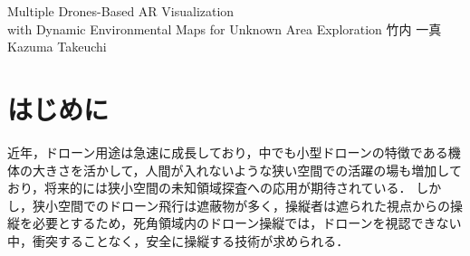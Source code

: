 \documentclass[a4paper,10pt,twocolumn,uplatex]{jsarticle}
\date{1}
\begin{document}
{Multiple Drones-Based AR Visualization \\with Dynamic Environmental Maps for Unknown Area Exploration}
{竹内 一真}
{Kazuma Takeuchi}


\section{はじめに}
近年，ドローン用途は急速に成長しており，中でも小型ドローンの特徴である機体の大きさを活かして，人間が入れないような狭い空間での活躍の場も増加しており，将来的には狭小空間の未知領域探査への応用が期待されている\cite{Nonami}．
しかし，狭小空間でのドローン飛行は遮蔽物が多く，操縦者は遮られた視点からの操縦を必要とするため，死角領域内のドローン操縦では，ドローンを視認できない中，衝突することなく，安全に操縦する技術が求められる．
\end{document}
